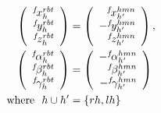 

\begin{align}
  \left(
  \begin{array}{r}
    ^{f}\!x^{rbt}_{h}\\
    ^{f}\!y^{rbt}_{h}\\
    ^{f}\!z^{rbt}_{h}\\
  \end{array}
  \right)
  &=
  \left(
  \begin{array}{r}
    ^{f}\!x^{hmn}_{h'}\\
    -^{f}\!y^{hmn}_{h'}\\
    ^{f}\!z^{hmn}_{h'}\\
  \end{array}
  \right),\\
  \left(
  \begin{array}{r}
    ^{f}\!\alpha^{rbt}_{h}\\
    ^{f}\!\beta^{rbt}_{h}\\
    ^{f}\!\gamma^{rbt}_{h}\\
  \end{array}
  \right)
  &=
  \left(
  \begin{array}{r}
    -^{f}\!\alpha^{hmn}_{h'}\\
    ^{f}\!\beta^{hmn}_{h'}\\
    -^{f}\!\gamma^{hmn}_{h'}\\
  \end{array}
  \right)\\
  {\rm where} \ \ h \cup h' &= \{rh, lh\} \nonumber
\end{align}


